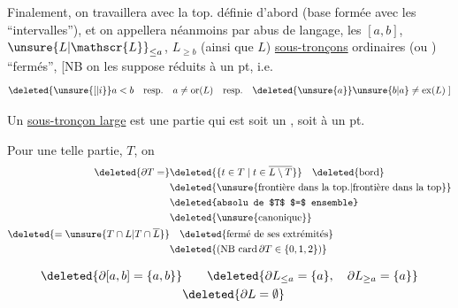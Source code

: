 \margin{Il \unsure{faut avoir|faudrait avoir} que $a\in\complement[x,y]$ mais $]a,b[\,\subset [x,y]$}
Finalement, on travaillera avec la top. définie d'abord (base formée avec les ``intervalles''), et on appellera néanmoins par abus de langage, les $[a,b]$, $\unsure{L|\mathscr{L}}_{\leq a}$, $L_{\geq b}$ (ainsi que $L$) \uline{sous-tronçons} ordinaires (ou ) ``fermés'', [NB on les suppose  réduits à un pt, i.e.
\[
\deleted{\unsure{[|i}} a<b\quad \text{resp.}\quad a\ne\mathrm{or}(L)\quad \text{resp.}\quad \deleted{\unsure{a}}\unsure{b|a}\ne\mathrm{ex}(L)\;]
\]

Un \uline{sous-tronçon  large} est une  partie qui est soit un , soit  à un pt.

Pour une telle partie, $T$, on
\[
\begin{aligned}
\deleted{\partial T=}&\deleted{\{t\in T\mid t\in \overline{L\setminus T}\}}\quad\text{\deleted{bord}}\\
 &\text{\deleted{\unsure{frontière dans la top.|frontière dans la top}}}\\
 &\text{\deleted{absolu de $T$ $=$ ensemble}}\\
 &\text{\deleted{\unsure{canonique}}}\\
 \deleted{={}\unsure{T\cap L|T\cap\overline{L}}}&\quad\text{\deleted{fermé de ses extrémités}}\\
 &\deleted{(\mathrm{NB}\ \mathrm{card}\,\partial T\in\{0,1,2\})}
\end{aligned}
\]


\[
\begin{aligned}
 \deleted{\partial[a,b]=\{a,b\}}&\qquad \deleted{\partial L_{\leq a}=\{a\},\quad \partial L_{\geq a}=\{a\}}\\
 &\deleted{\partial L=\emptyset}
\end{aligned}
\]
